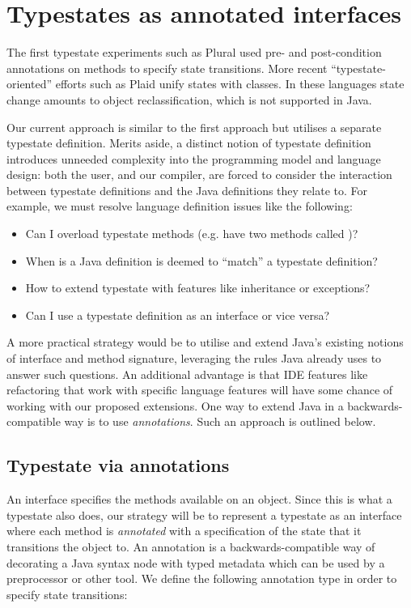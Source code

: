 \section{Typestates as annotated interfaces}

The first typestate experiments such as Plural \cite{bierhoff11} used
pre- and post-condition annotations on methods to specify state
transitions. More recent ``typestate-oriented'' efforts such as Plaid
\cite{garcia14} unify states with classes. In these languages state
change amounts to object reclassification, which is not supported in
Java.

Our current approach is similar to the first approach but utilises a
separate typestate definition. Merits aside, a distinct notion of
typestate definition introduces unneeded complexity into the
programming model and language design: both the user, and our
compiler, are forced to consider the interaction between typestate
definitions and the Java definitions they relate to. For example, we
must resolve language definition issues like the following:

\begin{itemize}
\item Can I overload typestate methods (e.g. have two methods called
  )?
\item When is a Java definition is deemed to ``match'' a typestate
  definition?
\item How to extend typestate with features like inheritance or exceptions?
\item Can I use a typestate definition as an interface or vice versa?
\end{itemize}

\noindent A more practical strategy would be to utilise and extend
Java's existing notions of interface and method signature, leveraging
the rules Java already uses to answer such questions. An additional
advantage is that IDE features like refactoring that work with
specific language features will have some chance of working with our
proposed extensions. One way to extend Java in a backwards-compatible
way is to use \emph{annotations}. Such an approach is outlined below.

\subsection{Typestate via annotations}

An interface specifies the methods available on an object. Since this
is what a typestate also does, our strategy will be to represent a
typestate as an interface where each method is \emph{annotated} with a
specification of the state that it transitions the object to. An
annotation is a backwards-compatible way of decorating a Java syntax
node with typed metadata which can be used by a preprocessor or other
tool. We define the following annotation type  in order to
specify state transitions:

